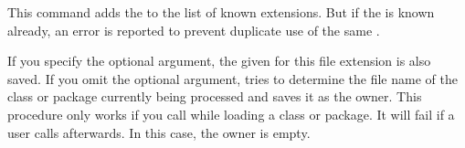 \begin{Declaration}
\end{Declaration}
This command adds the  to the list of known extensions. But
if the  is known already, an error is reported to prevent
duplicate use of the same .

If you specify the optional  argument, the given
 for this file extension is also saved. If you omit the optional
argument,  tries to determine the file name of the class or
package currently being processed and saves it as the owner.
This procedure only works if you call
 while loading a class or package. It will fail if a user
calls  afterwards. In this case, the owner is empty.

